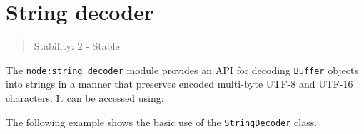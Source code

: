 \section{String decoder}\label{string-decoder}

\begin{quote}
Stability: 2 - Stable
\end{quote}

The \texttt{node:string\_decoder} module provides an API for decoding
\texttt{Buffer} objects into strings in a manner that preserves encoded
multi-byte UTF-8 and UTF-16 characters. It can be accessed using:

\begin{Shaded}
\begin{Highlighting}[]
\OperatorTok{=} \NormalTok{(}\NormalTok{)}\OperatorTok{;}
\end{Highlighting}
\end{Shaded}

The following example shows the basic use of the \texttt{StringDecoder}
class.

\begin{Shaded}
\begin{Highlighting}[]
\OperatorTok{=} \NormalTok{(}\NormalTok{)}\OperatorTok{;}
\OperatorTok{=}  \NormalTok{(}\NormalTok{)}\OperatorTok{;}

\OperatorTok{=} \NormalTok{([}\OperatorTok{,} \NormalTok{])}\OperatorTok{;}
\OperatorTok{;} 

\OperatorTok{=} \NormalTok{([}\OperatorTok{,} \OperatorTok{,} \NormalTok{])}\OperatorTok{;}
\OperatorTok{;} 
\end{Highlighting}
\end{Shaded}

